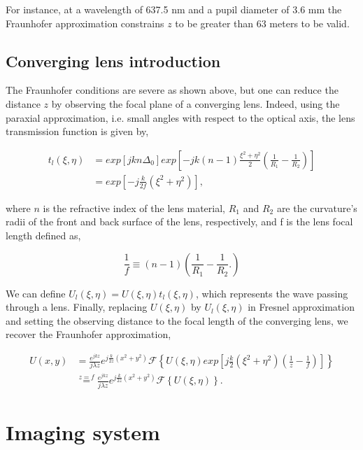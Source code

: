 For instance, at a wavelength of 637.5 nm and a pupil diameter of 3.6 mm the Fraunhofer approximation constrains $z$ to be greater than 63 meters to be valid.

\subsection{Converging lens introduction}
\label{subsec:ConvLensIntro}

The Fraunhofer conditions are severe as shown above, but one can reduce the distance $z$ by observing the focal plane of a converging lens. Indeed, using the paraxial approximation, i.e. small angles with respect to the optical axis, the lens transmission function is given by,

\begin{align}
t_l(\xi , \eta) &= exp \left[ j k n \Delta_0 \right] exp \left[ -jk \left( n-1 \right)\frac{ \xi^2 + \eta^2 }{2}\left( \frac{1}{R_1} - \frac{1}{R_2}\right) \right] \nonumber \\ 
&= exp \left[ -j \frac{k}{2f} (\xi^2+\eta^2) \right] ,
\label{eqt:lensTl}
\end{align}

where $n$ is the refractive index of the lens material, $R_1$ and $R_2$ are the curvature's radii of the front and back surface of the lens, respectively, and f is the lens focal length defined as,

\begin{equation}
\frac{1}{f} \equiv (n-1)\left(\frac{1}{R_1}-\frac{1}{R_2}. \right)
\label{eqt:focal_length}
\end{equation}

We can define $U_l(\xi,\eta) = U(\xi,\eta)t_l(\xi,\eta)$, which represents the wave passing through a lens. Finally, replacing $U(\xi,\eta)$ by $U_l(\xi,\eta)$ in Fresnel approximation and setting the observing distance to the focal length of the converging lens, we recover the Fraunhofer approximation,

\begin{align}
U(x,y) &= \frac{e^{jkz}}{j\lambda z} e^{j\frac{k}{2z}(x^2+y^2)}  \mathcal{F}\left\lbrace U(\xi,\eta) exp\left[j\frac{k}{2}(\xi^2+\eta^2)(\frac{1}{z}-\frac{1}{f})\right]\right\rbrace \nonumber \\
&\overset{z=f}{=} \frac{e^{jkz}}{j\lambda z} e^{j\frac{k}{2z}(x^2+y^2)}  \mathcal{F}\left\lbrace U(\xi,\eta)\right\rbrace.
\end{align}

\section{Imaging system}
\label{sec:ImSystem}

